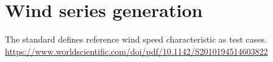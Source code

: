 \documentclass[]{article}
\begin{document}
\newpage
\section{Wind series generation}
The standard defines reference wind speed characteristic as test cases. \url{https://www.worldscientific.com/doi/pdf/10.1142/S2010194514603822}

\newpage
{\footnotesize
}
\end{document}

